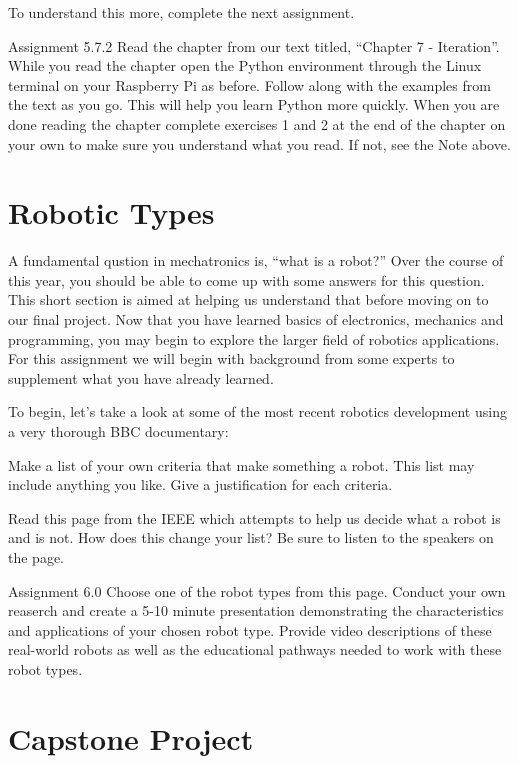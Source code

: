 \documentclass[
]{book}
\begin{document}
To understand this more, complete the next assignment.

Assignment 5.7.2
Read the chapter from our text titled, ``Chapter 7 - Iteration''. While you read the chapter open the Python environment through the Linux terminal on your Raspberry Pi as before. Follow along with the examples from the text as you go. This will help you learn Python more quickly. When you are done reading the chapter complete exercises 1 and 2 at the end of the chapter on your own to make sure you understand what you read. If not, see the Note above.

\hypertarget{robotic-types}{%
\chapter{Robotic Types}\label{robotic-types}}

A fundamental qustion in mechatronics is, ``what is a robot?'' Over the course of this year, you should be able to come up with some answers for this question. This short section is aimed at helping us understand that before moving on to our final project. Now that you have learned basics of electronics, mechanics and programming, you may begin to explore the larger field of robotics applications. For this assignment we will begin with background from some experts to supplement what you have already learned.

To begin, let's take a look at some of the most recent robotics development using a very thorough BBC documentary:

Make a list of your own criteria that make something a robot. This list may include anything you like. Give a justification for each criteria.

Read this page from the IEEE which attempts to help us decide what a robot is and is not. How does this change your list? Be sure to listen to the speakers on the page.

Assignment 6.0
Choose one of the robot types from this page. Conduct your own reaserch and create a 5-10 minute presentation demonstrating the characteristics and applications of your chosen robot type. Provide video descriptions of these real-world robots as well as the educational pathways needed to work with these robot types.

\hypertarget{capstone-project}{%
\chapter{Capstone Project}\label{capstone-project}}
\end{document}

